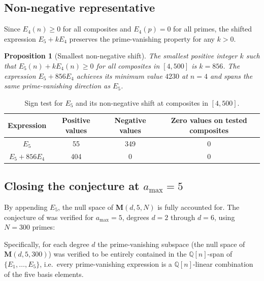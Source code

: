 \documentclass[11pt]{article}
\newtheorem{proposition}[theorem]{Proposition}
\newcommand{\Q}{\mathbb{Q}}
\begin{document}
\subsection{Non-negative representative}

Since $E_4(n)\ge 0$ for all composites and $E_4(p)=0$ for all primes, the shifted
expression $E_5+kE_4$ preserves the prime-vanishing property for any $k>0$.

\begin{proposition}[Smallest non-negative shift]
\label{prop:E5-nonneg}
The smallest positive integer $k$ such that $E_5(n)+kE_4(n)\ge 0$ for all composites in
$[4,500]$ is $k=856$.
The expression $E_5+856E_4$ achieves its minimum value $4230$ at $n=4$ and spans the same
prime-vanishing direction as $E_5$.
\end{proposition}

\begin{table}[htbp]
\centering
\caption{Sign test for $E_5$ and its non-negative shift at composites in $[4,500]$.}
\label{tab:E5-sign-tests}
\begin{tabular}{@{}cccc@{}}
\toprule
Expression & Positive values & Negative values & Zero values on tested composites \\
\midrule
$E_5$         & 55  & 349 & 0 \\
$E_5+856E_4$  & 404 &   0 & 0 \\
\bottomrule
\end{tabular}
\end{table}

\subsection{Closing the conjecture at $a_{\max}=5$}

By appending $E_5$, the null space of $\mathbf{M}(d,5,N)$ is fully accounted for.
The conjecture of \cite{CIO2024} was verified for $a_{\max}=5$, degrees $d=2$ through $d=6$,
using $N=300$ primes:

Specifically, for each degree $d$ the prime-vanishing subspace (the null space of
$\mathbf{M}(d,5,300)$) was verified to be entirely contained in the $\Q[n]$-span of
$\{E_1,\dots,E_5\}$, i.e.\ every prime-vanishing expression is a $\Q[n]$-linear
combination of the five basis elements.
\end{document}
